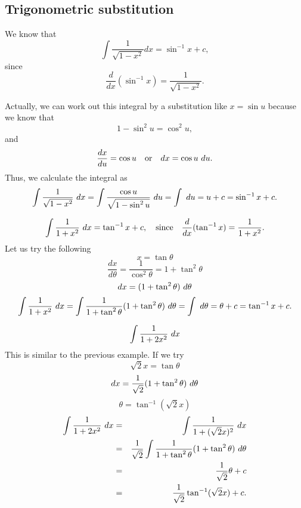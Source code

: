 \subsection{Trigonometric substitution}
\begin{example}
We know that 
\[\int \frac{1}{\sqrt{1-x^2}}dx=\sin^{-1}x+c,\]
since 
\[\frac{d}{dx}(\sin^{-1}x)=\frac{1}{\sqrt{1-x^2}}.\]

Actually, we can work out this integral by a substitution like $x=\sin u$ because we know that
\[1-\sin^2u=\cos^2u,\]
and 
\[\frac{dx}{du}=\cos u\quad \text{or} \quad dx=\cos u\dx[u].\]
Thus, we calculate the integral as
\[\int \frac{1}{\sqrt{1-x^2}}\dx=\int\frac{\cos u}{\sqrt{1-\sin^2u}}\dx[u]=\int\dx[u]=u+c=\sin^{-1}x+c.\]
\end{example}

\begin{example}
\[\int\frac{1}{1+x^2}\dx=\tan^{-1}x+c,\quad \text{since}\quad \frac{d}{dx}(\tan^{-1}x)=\frac{1}{1+x^2}.\]
Let us try the following
\[x=\tan\theta\]
\[\frac{dx}{d\theta}=\frac{1}{\cos^2\theta}=1+\tan^2\theta\]
\[dx=(1+\tan^2\theta)\dx[\theta]\]
\[\int\frac{1}{1+x^2}\dx=\int\frac{1}{1+\tan^2\theta}(1+\tan^2\theta)\dx[\theta]=\int\dx[\theta]=\theta+c=\tan^{-1}x+c.\]
\end{example}

\begin{example}
\[\int\frac{1}{1+2x^2}\dx\]
This is similar to the previous example. If we try
\[\sqrt{2}x=\tan\theta\]
\[dx=\frac{1}{\sqrt{2}}(1+\tan^2\theta)\dx[\theta]\]
\[\theta=\tan^{-1}(\sqrt{2}x)\]
\begin{eqnarray*}
\int\frac{1}{1+2x^2}\dx &=& \int\frac{1}{1+(\sqrt{2}x)^2}\dx \\
&=&\frac{1}{\sqrt{2}}\int\frac{1}{1+\tan^2\theta}(1+\tan^2\theta)\dx[\theta] \\
&=& \frac{1}{\sqrt{2}}\theta+c \\
&=& \frac{1}{\sqrt{2}}\tan^{-1}(\sqrt{2}x)+c.
\end{eqnarray*}
\end{example}


